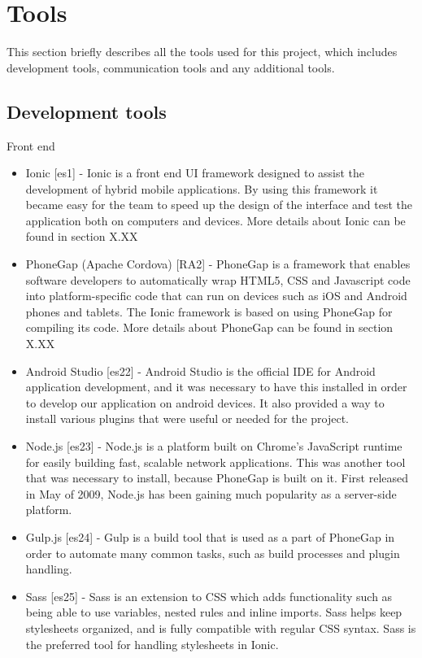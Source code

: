 
\chapter{Tools}

This section briefly describes all the tools used for this project, which includes development tools, communication tools and any additional tools.

\section{Development tools}

Front end
\begin{itemize}
	\item Ionic [es1] - Ionic is a front end UI framework designed to assist the development of hybrid mobile applications. By using this framework it became easy for the team to speed up the design of the interface and test the application both on computers and devices. More details about Ionic can be found in section X.XX
	\item PhoneGap (Apache Cordova) [RA2] - PhoneGap is a framework that enables software developers to automatically wrap HTML5, CSS and Javascript code into platform-specific code that can run on devices such as iOS and Android phones and tablets. The Ionic framework is based on using PhoneGap for compiling its code. More details about PhoneGap can be found in section X.XX
	\item Android Studio [es22] - Android Studio is the official IDE for Android application development, and it was necessary to have this installed in order to develop our application on android devices. It also provided a way to install various plugins that were useful or needed for the project.
	\item Node.js [es23] - Node.js is a platform built on Chrome’s JavaScript runtime for easily building fast, scalable network applications. This was another tool that was necessary to install, because PhoneGap is built on it. First released in May of 2009, Node.js has been gaining much popularity as a server-side platform.
	\item Gulp.js [es24] - Gulp is a build tool that is used as a part of PhoneGap in order to automate many common tasks, such as build processes and plugin handling.
	\item Sass [es25] - Sass is an extension to CSS which adds functionality such as being able to use variables, nested rules and inline imports. Sass helps keep stylesheets organized, and is fully compatible with regular CSS syntax. Sass is the preferred tool for handling stylesheets in Ionic.

\end{itemize}
